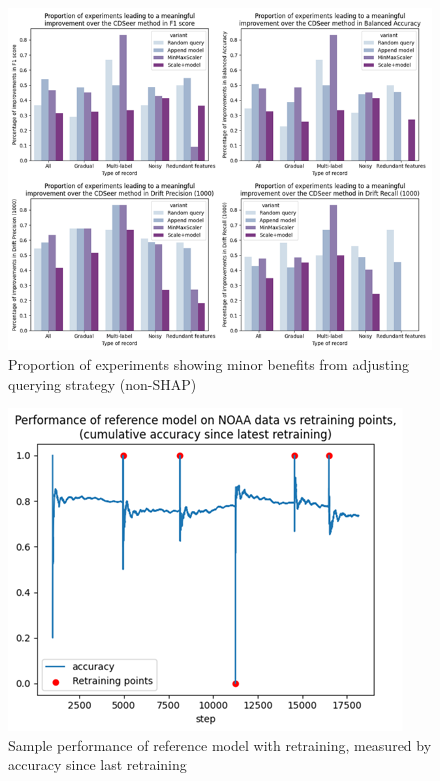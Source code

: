 \documentclass{svproc}
\begin{document}
 \begin{figure}
 	\centering
 	\includegraphics[scale=.7]{figures/Fig15_composite.png}
 	\caption{Proportion of experiments showing minor benefits from adjusting querying strategy (non-SHAP)}
 	\label{fig:fig15}
 \end{figure}
 
 	\begin{figure}
 	\centering
 	\includegraphics[scale=.7]{figures/Fig16_model.png}
 	\caption{Sample performance of reference model with retraining, measured by accuracy since last retraining}
 	\label{fig:fig16}
 	\end{figure}
 
\end{document}
